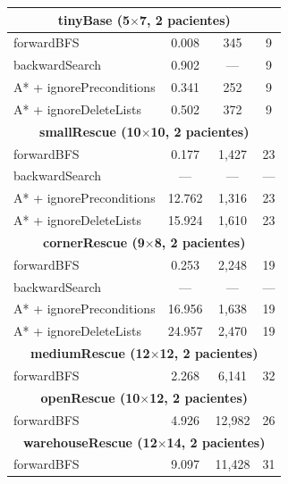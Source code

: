 \begin{table}[H]
\begin{center}
\begin{tabular}{|l|c|c|c|}
\hline
\multicolumn{4}{|c|}{\textbf{tinyBase (5$\times$7, 2 pacientes)}} \\
\hline
forwardBFS & 0.008 & 345 & 9 \\
backwardSearch & 0.902 & --- & 9 \\
A* + ignorePreconditions & 0.341 & 252 & 9 \\
A* + ignoreDeleteLists & 0.502 & 372 & 9 \\
\hline
\multicolumn{4}{|c|}{\textbf{smallRescue (10$\times$10, 2 pacientes)}} \\
\hline
forwardBFS & 0.177 & 1,427 & 23 \\
backwardSearch & --- & --- & --- \\
A* + ignorePreconditions & 12.762 & 1,316 & 23 \\
A* + ignoreDeleteLists & 15.924 & 1,610 & 23 \\
\hline
\multicolumn{4}{|c|}{\textbf{cornerRescue (9$\times$8, 2 pacientes)}} \\
\hline
forwardBFS & 0.253 & 2,248 & 19 \\
backwardSearch & --- & --- & --- \\
A* + ignorePreconditions & 16.956 & 1,638 & 19 \\
A* + ignoreDeleteLists & 24.957 & 2,470 & 19 \\
\hline
\multicolumn{4}{|c|}{\textbf{mediumRescue (12$\times$12, 2 pacientes)}} \\
\hline
forwardBFS & 2.268 & 6,141 & 32 \\
\hline
\multicolumn{4}{|c|}{\textbf{openRescue (10$\times$12, 2 pacientes)}} \\
\hline
forwardBFS & 4.926 & 12,982 & 26 \\
\hline
\multicolumn{4}{|c|}{\textbf{warehouseRescue (12$\times$14, 2 pacientes)}} \\
\hline
forwardBFS & 9.097 & 11,428 & 31 \\
\hline
\end{tabular}
\end{center}
\end{table}